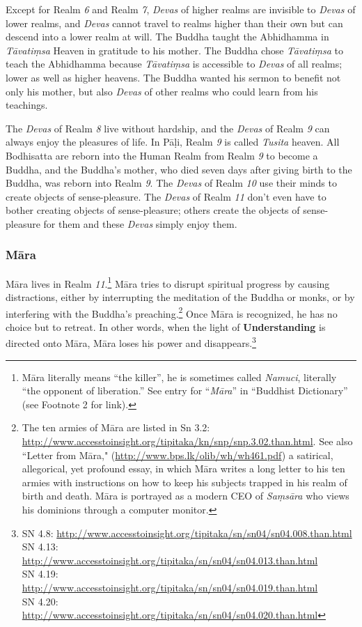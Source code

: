Except for Realm \textit{6} and Realm \textit{7}, \textit{Devas} of higher realms are invisible to \textit{Devas} of lower realms, and \textit{Devas} cannot travel to realms higher than their own but can descend into a lower realm at will. The Buddha taught the Abhidhamma in \textit{Tāvatiṃsa} Heaven in gratitude to his mother. The Buddha chose \textit{Tāvatiṃsa} to teach the Abhidhamma because \textit{Tāvatiṃsa} is accessible to \textit{Devas} of all realms; lower as well as higher heavens. The Buddha wanted his sermon to benefit not only his mother, but also \textit{Devas} of other realms who could learn from his teachings.

The \textit{Devas} of Realm \textit{8} live without hardship, and the \textit{Devas} of Realm \textit{9} can always enjoy the pleasures of life. In Pāḷi, Realm \textit{9} is called \textit{Tusita} heaven. All Bodhisatta are reborn into the Human Realm from Realm \textit{9} to become a Buddha, and the Buddha’s mother, who died seven days after giving birth to the Buddha, was reborn into Realm \textit{9}. The \textit{Devas} of Realm \textit{10} use their minds to create objects of sense-pleasure. The \textit{Devas} of Realm \textit{11} don’t even have to bother creating objects of sense-pleasure; others create the objects of sense-pleasure for them and these \textit{Devas} simply enjoy them.

\subsubsection*{Māra}

Māra lives in Realm \textit{11}.\footnote{Māra literally means “the killer”, he is sometimes called \textit{Namuci}, literally “the opponent of liberation.” See entry for “\textit{Māra}” in “Buddhist Dictionary” (see Footnote 2 for link).} Māra tries to disrupt spiritual progress by causing distractions, either by interrupting the meditation of the Buddha or monks, or by interfering with the Buddha’s preaching.\footnote{The ten armies of Māra are listed in Sn 3.2: \url{http://www.accesstoinsight.org/tipitaka/kn/snp/snp.3.02.than.html}. See also “Letter from Māra," (\url{http://www.bps.lk/olib/wh/wh461.pdf}) a satirical, allegorical, yet profound essay, in which Māra writes a long letter to his ten armies with instructions on how to keep his subjects trapped in his realm of birth and death. Māra is portrayed as a modern CEO of \textit{Saṃsāra} who views his dominions through a computer monitor.} Once Māra is recognized, he has no choice but to retreat. In other words, when the light of \textbf{Understanding} is directed onto Māra, Māra loses his power and disappears.\footnote{SN 4.8: \url{http://www.accesstoinsight.org/tipitaka/sn/sn04/sn04.008.than.html}\\SN 4.13: \url{http://www.accesstoinsight.org/tipitaka/sn/sn04/sn04.013.than.html}\\SN 4.19: \url{http://www.accesstoinsight.org/tipitaka/sn/sn04/sn04.019.than.html}\\SN 4.20: \url{http://www.accesstoinsight.org/tipitaka/sn/sn04/sn04.020.than.html}}

